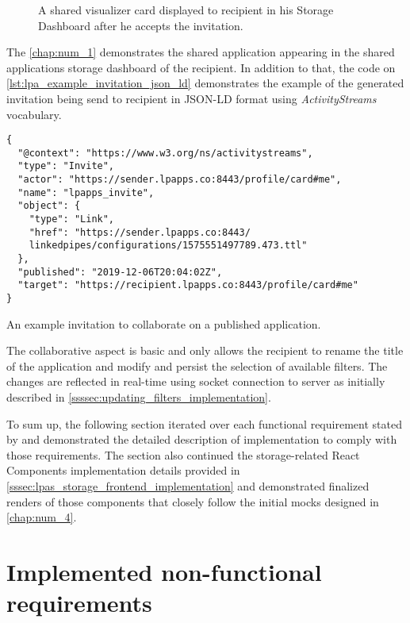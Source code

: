 \begin{figure}[h]
\centering
{}
\caption{A shared visualizer card displayed to recipient in his Storage Dashboard after he accepts the invitation.}
\label{fig:lpa_shared_visualizer_card}
\end{figure}

The \autoref{chap:num_1} demonstrates the shared application appearing in the shared applications storage dashboard of the recipient. In addition to that, the code on \autoref{lst:lpa_example_invitation_json_ld} demonstrates the example of the generated invitation being send to recipient in JSON-LD format using \textit{ActivityStreams} vocabulary. 

\begin{listing}[H]    
\begin{verbatim}
{
  "@context": "https://www.w3.org/ns/activitystreams",
  "type": "Invite",
  "actor": "https://sender.lpapps.co:8443/profile/card#me",
  "name": "lpapps_invite",
  "object": {
    "type": "Link",
    "href": "https://sender.lpapps.co:8443/
    linkedpipes/configurations/1575551497789.473.ttl"
  },
  "published": "2019-12-06T20:04:02Z",
  "target": "https://recipient.lpapps.co:8443/profile/card#me"
}
\end{verbatim}
\caption{An example invitation to collaborate on a published application.} 
\label{lst:lpa_example_invitation_json_ld}
\end{listing}

The collaborative aspect is basic and only allows the recipient to rename the title of the application and modify and persist the selection of available filters. The changes are reflected in real-time using socket connection to \solid{} server as initially described in \autoref{ssssec:updating_filters_implementation}.

To sum up, the following section iterated over each functional requirement stated by \lpa{} and demonstrated the detailed description of implementation to comply with those requirements. The section also continued the storage-related React Components implementation details provided in \autoref{sssec:lpas_storage_frontend_implementation} and demonstrated finalized renders of those components that closely follow the initial mocks designed in \autoref{chap:num_4}. 

\section{Implemented non-functional requirements}
\label{ssec:non_functional_requirements_implementation}

